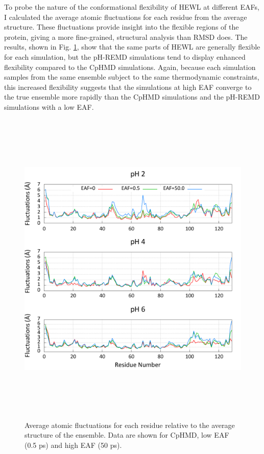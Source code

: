 To probe the nature of the conformational flexibility of HEWL at different EAFs,
I calculated the average atomic fluctuations for each residue from the average
structure. These fluctuations provide insight into the flexible regions of the
protein, giving a more fine-grained, structural analysis than RMSD does.  The
results, shown in Fig. \ref{fig3:fluxes}, show that the same parts of HEWL are
generally flexible for each simulation, but the pH-REMD simulations tend to
display enhanced flexibility compared to the CpHMD simulations.  Again, because
each simulation samples from the same ensemble subject to the same thermodynamic
constraints, this increased flexibility suggests that the simulations at high
EAF converge to the true ensemble more rapidly than the CpHMD simulations and
the pH-REMD simulations with a low EAF.

\begin{figure}
 \includegraphics[width=6.5in, height=6.09in]{residue_fluctuations.png}
 \caption[Average atomic fluctuations for each residue relative to the average
          structure of the ensemble.]
         {Average atomic fluctuations for each residue relative to the average
          structure of the ensemble. Data are shown for CpHMD, low EAF (0.5
          ps) and high EAF (50 ps).}
 \label{fig3:fluxes}
\end{figure}

